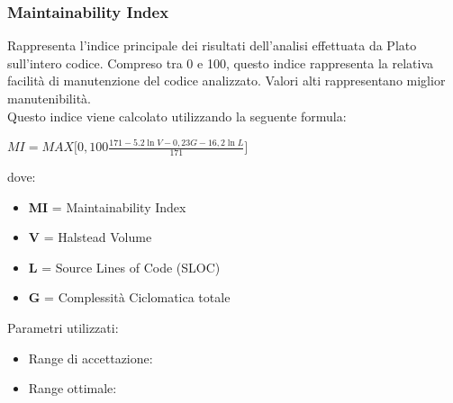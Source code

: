 \documentclass[a4paper,11pt]{article}
\begin{document}
\subsubsection{Maintainability Index} Rappresenta l'indice principale dei risultati dell'analisi effettuata da Plato sull'intero codice. Compreso tra 0 e 100, questo indice rappresenta la relativa facilità di manutenzione del codice analizzato. Valori alti rappresentano miglior manutenibilità.\\
Questo indice viene calcolato utilizzando la seguente formula: \\
\begin{center}
\begin{math}
MI = MAX\bigg[ 0,100 \frac{171-5.2\ln V - 0,23G - 16,2\ln L}{171} \bigg]
\end{math}
\end{center}
dove: 
\begin{itemize}
\item \textbf{MI} = Maintainability Index
\item \textbf{V} = Halstead Volume
\item \textbf{L} = Source Lines of Code (SLOC)
\item \textbf{G} = Complessità Ciclomatica totale
\end{itemize}
Parametri utilizzati: 
\begin{itemize}
	\item Range di accettazione: \begin{math}[20 - 100]\end{math}
	\item Range ottimale: \begin{math}[70 - 100]\end{math}
	\end{itemize}
\end{document}
